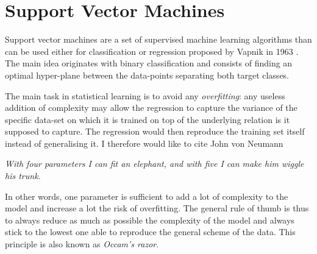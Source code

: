 \section{Support Vector Machines}
Support vector machines are a set of supervised machine learning algorithms than can be used either for classification or regression proposed by Vapnik in 1963 \cite{VapLer63}. The main idea originates with binary classification and consists of finding an optimal hyper-plane between the data-points separating both target classes. 







The main task in statistical learning is to avoid any \emph{overfitting}: any useless addition of complexity may allow the regression to capture the variance of the specific data-set on which it is trained on top of the underlying relation is it supposed to capture. The regression would then reproduce the training set itself instead of generalising it. I therefore would like to cite John von Neumann
\begin{displayquote}
\emph{With four parameters I can fit an elephant, and with five I can make him wiggle his trunk.}
\end{displayquote}

In other words, one parameter is sufficient to add a lot of complexity to the model and increase a lot the risk of overfitting. The general rule of thumb is thus to always reduce as much as possible the complexity of the model and always stick to the lowest one able to reproduce the general scheme of the data. This principle is also known as \emph{Occam's razor}.